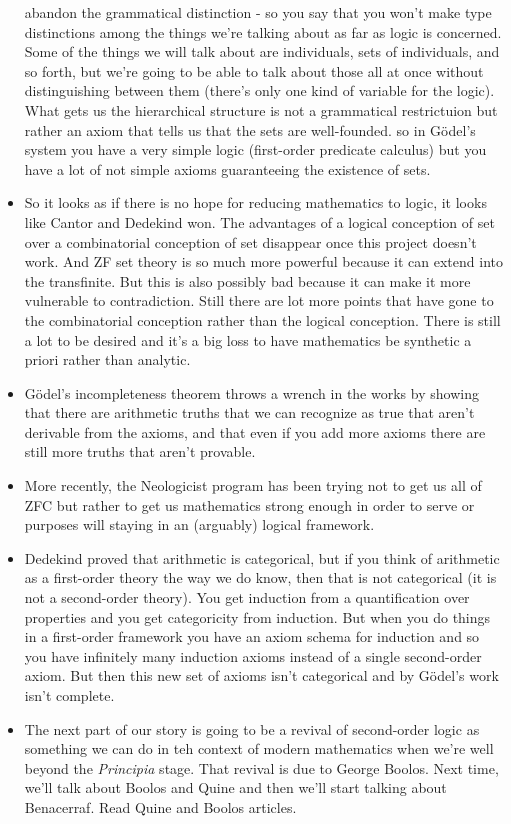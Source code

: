 \documentclass[12pt]{article}
\theoremstyle{definition}
\begin{document}
\begin{itemize}
        abandon the grammatical distinction - so you say that you won't make
        type distinctions among the things we're talking about as far as logic
        is concerned.  Some of the things we will talk about are individuals,
        sets of individuals, and so forth, but we're going to be able to talk
        about those all at once without distinguishing between them (there's
        only one kind of variable for the logic). What gets us the hierarchical
        structure is not a grammatical restrictuion but rather an axiom that
        tells us that the sets are well-founded. so in G\"odel's system you
        have a very simple logic (first-order predicate calculus) but you have
        a lot of not simple axioms guaranteeing the existence of sets. 
    \item
        So it looks as if there is no hope for reducing mathematics to logic,
        it looks like Cantor and Dedekind won. The advantages of a logical
        conception of set over a combinatorial conception of set disappear once
        this project doesn't work. And ZF set theory is so much more powerful
        because it can extend into the transfinite. But this is also possibly
        bad because it can make it more vulnerable to contradiction. Still
        there are lot more points that have gone to the combinatorial
        conception rather than the logical conception. There is still a lot to
        be desired and it's a big loss to have mathematics be synthetic a
        priori rather than analytic. 
    \item
        G\"odel's incompleteness theorem throws a wrench in the works by
        showing that there are arithmetic truths that we can recognize as true
        that aren't derivable from the axioms, and that even if you add more
        axioms there are still more truths that aren't provable.
    \item
        More recently, the Neologicist program has been trying not to get us
        all of ZFC but rather to get us mathematics strong enough in order to
        serve or purposes will staying in an (arguably) logical framework.
    \item
        Dedekind proved that arithmetic is categorical, but if you think of
        arithmetic as a first-order theory the way we do know, then that is not
        categorical (it is not a second-order theory). You get induction from a
        quantification over properties and you get categoricity from induction.
        But when you do things in a first-order framework you have an axiom
        schema for induction and so you have infinitely many induction axioms
        instead of a single second-order axiom. But then this new set of axioms
        isn't categorical and by G\"odel's work isn't complete. 
    \item
        The next part of our story is going to be a revival of second-order
        logic as something we can do in teh context of modern mathematics when
        we're well beyond the \textit{Principia} stage. That revival is due to
        George Boolos. Next time, we'll talk about Boolos and Quine and then
        we'll start talking about Benacerraf. Read Quine and Boolos articles.


\end{itemize}
\end{document}
